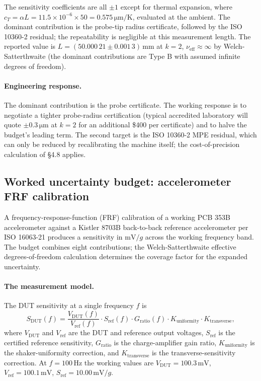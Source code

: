 The sensitivity coefficients are all $\pm 1$ except for thermal
expansion, where $c_{T} = \alpha L = 11.5 \times 10^{-6}
\times 50 = 0.575\,\si{\micro\meter}/\si{\kelvin}$, evaluated
at the ambient. The dominant contribution is the probe-tip
radius certificate, followed by the ISO 10360-2 residual; the
repeatability is negligible at this measurement length. The
reported value is $L = (50.000\,21 \pm 0.001\,3)\,\si{\milli
\meter}$ at $k = 2$, $\nu_{\text{eff}} \approx \infty$ by
Welch-Satterthwaite (the dominant contributions are Type B
with assumed infinite degrees of freedom).

\paragraph{Engineering response.} The dominant contribution is
the probe certificate. The working response is to negotiate a
tighter probe-radius certification (typical accredited
laboratory will quote $\pm 0.3\,\si{\micro\meter}$ at $k = 2$
for an additional \$400 per certificate) and to halve the
budget's leading term. The second target is the
ISO 10360-2 MPE residual, which can only be reduced by
recalibrating the machine itself; the cost-of-precision
calculation of \S 4.8 applies.

\subsection{Worked uncertainty budget: accelerometer FRF
calibration}

A frequency-response-function (FRF) calibration of a working
PCB 353B accelerometer \cite{web:ch04t3b-pcb-353b} against a
Kistler 8703B back-to-back reference accelerometer
\cite{web:ch04t3b-kistler-8703b} per ISO 16063-21
\cite{std:ch04t3b-iso-16063-21} produces a sensitivity in
$\si{\milli\volt}/g$ across the working frequency band. The
budget combines eight contributions; the Welch-Satterthwaite
effective degrees-of-freedom calculation determines the
coverage factor for the expanded uncertainty.

\paragraph{The measurement model.} The DUT sensitivity at a
single frequency $f$ is
\[
S_{\text{DUT}}(f) = \frac{V_{\text{DUT}}(f)}{V_{\text{ref}}(f)}
\cdot S_{\text{ref}}(f) \cdot G_{\text{ratio}}(f)
\cdot K_{\text{uniformity}} \cdot K_{\text{transverse}},
\]
where $V_{\text{DUT}}$ and $V_{\text{ref}}$ are the DUT and
reference output voltages, $S_{\text{ref}}$ is the certified
reference sensitivity, $G_{\text{ratio}}$ is the
charge-amplifier gain ratio, $K_{\text{uniformity}}$ is the
shaker-uniformity correction, and $K_{\text{transverse}}$ is
the transverse-sensitivity correction. At $f = 100\,\si{
\hertz}$ the working values are $V_{\text{DUT}} = 100.3\,\si{
\milli\volt}$, $V_{\text{ref}} = 100.1\,\si{\milli\volt}$,
$S_{\text{ref}} = 10.00\,\si{\milli\volt}/g$.

